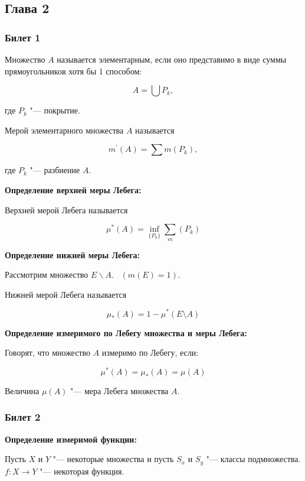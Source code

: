 \subsection{Глава 2}

\subsubsection{Билет 1}

Множество $A$ называется элементарным, если 
оно представимо в виде суммы прямоугольников
хотя бы 1 способом:

\[
    A = \bigcup P_k,
\]

где ${P_k}$ "--- покрытие.
\bigskip


Мерой элементарного множества $A$ называется

\[
    m^{'}(A) = \sum m (P_k),
\]

где ${P_k}$ "--- разбиение $A$.
\bigskip

\textbf{Определение верхней меры Лебега:}
    \smallskip

    Верхней мерой Лебега называется

    \[
        \mu^{*}(A) = \inf_{\{P_k\}} \sum_m (P_k)  
    \]
    \bigskip

\textbf{Определение нижней меры Лебега:}
    \smallskip

    Рассмотрим множество $E \backslash A. \;\;\;
    (m(E) = 1).$ 

    Нижней мерой Лебега называется

    \[
        \mu_{*}(A) = 1 - \mu^{*}(E \setminus A)
    \]
    \bigskip

\textbf{Определение измеримого по Лебегу 
множества и меры Лебега:}
    \smallskip
    
    Говорят, что множество $A$ измеримо по Лебегу,
    если:

    \[
        \mu^{*}(A) = \mu_{*}(A) = \mu (A)
    \]

    Величина $\mu(A)$ "--- мера Лебега множества
    $A$.
    \bigskip

\subsubsection{Билет 2}

\textbf{Определение измеримой функции:}
    \smallskip

    Пусть $X$ и $Y$ "--- некоторые множества
    и пусть $S_x$ и $S_y$ "--- классы подмножества.
    $f: X \rightarrow Y$ "--- некоторая функция.
    \smallskip

